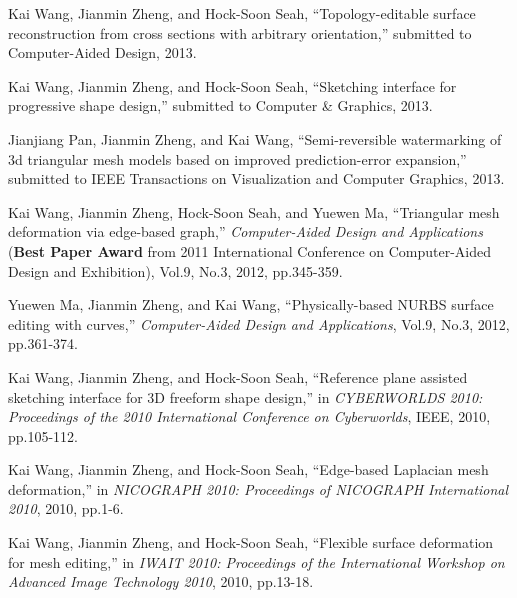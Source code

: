 \begin{enumerate}[ {[}1{]} ]

\item Kai Wang, Jianmin Zheng, and Hock-Soon Seah,
``Topology-editable surface reconstruction from cross sections with
arbitrary orientation,'' submitted to Computer-Aided Design, 2013.

\item Kai Wang, Jianmin Zheng, and Hock-Soon Seah,
``Sketching interface for progressive shape design,'' submitted to
Computer \& Graphics, 2013.

\item Jianjiang Pan, Jianmin Zheng, and Kai Wang,
``Semi-reversible watermarking of 3d triangular mesh models based on
improved prediction-error expansion,'' submitted to
IEEE Transactions on Visualization and Computer Graphics, 2013.

\item Kai Wang, Jianmin Zheng, Hock-Soon Seah, and Yuewen
Ma, ``Triangular mesh deformation via edge-based graph,''
\emph{Computer-Aided Design and Applications} ({\bf Best Paper
Award} from 2011 International Conference on Computer-Aided Design
and Exhibition), Vol.9, No.3, 2012, pp.345-359.

\item Yuewen Ma, Jianmin Zheng, and Kai Wang,
``Physically-based NURBS surface editing with curves,''
\emph{Computer-Aided Design and Applications}, Vol.9, No.3, 2012,
pp.361-374.

\item Kai Wang, Jianmin Zheng, and Hock-Soon Seah,
``Reference plane assisted sketching interface for 3D freeform shape
design,'' in \emph{CYBERWORLDS 2010: Proceedings of the 2010
International Conference on Cyberworlds}, IEEE, 2010, pp.105-112.

\item Kai Wang, Jianmin Zheng, and Hock-Soon Seah,
``Edge-based Laplacian mesh deformation,'' in \emph{NICOGRAPH 2010:
Proceedings of NICOGRAPH International 2010}, 2010, pp.1-6.

\item Kai Wang, Jianmin Zheng, and Hock-Soon Seah,
``Flexible surface deformation for mesh editing,'' in \emph{IWAIT
2010: Proceedings of the International Workshop on Advanced Image
Technology 2010}, 2010, pp.13-18.

\end{enumerate}
